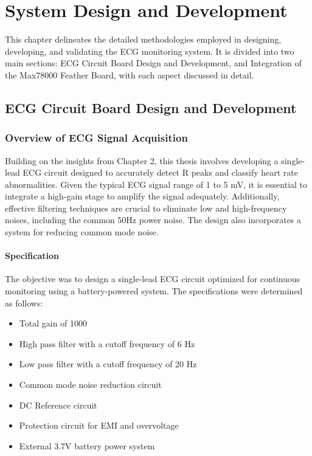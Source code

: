 
\chapter{System Design and Development}
\label{chap:system_design_and_development}

This chapter delineates the detailed methodologies employed in designing, developing, and validating the ECG monitoring system. It is divided into two main sections: ECG Circuit Board Design and Development, and Integration of the Max78000 Feather Board, with each aspect discussed in detail.

\section{ECG Circuit Board Design and Development}
\vspace{1em}
\subsection{Overview of ECG Signal Acquisition}
\vspace{1em}
Building on the insights from Chapter 2, this thesis involves developing a single-lead ECG circuit designed to accurately detect R peaks and classify heart rate abnormalities. Given the typical ECG signal range of 1 to 5 mV, it is essential to integrate a high-gain stage to amplify the signal adequately. Additionally, effective filtering techniques are crucial to eliminate low and high-frequency noises, including the common 50Hz power noise. The design also incorporates a system for reducing common mode noise.

\subsubsection{Specification}
\vspace{1em}
The objective was to design a single-lead ECG circuit optimized for continuous monitoring using a battery-powered system. The specifications were determined as follows:
\begin{itemize}
	\item Total gain of 1000
	\item High pass filter with a cutoff frequency of 6 Hz
	\item Low pass filter with a cutoff frequency of 20 Hz
	\item Common mode noise reduction circuit
	\item DC Reference circuit
	\item Protection circuit for EMI and overvoltage
	\item External 3.7V battery power system
\end{itemize}


